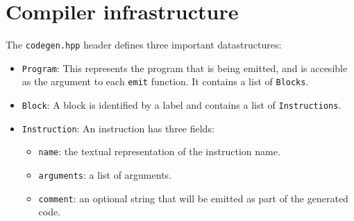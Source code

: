 \documentclass{report}
\begin{document}
	\section{Compiler infrastructure}
	The \texttt{codegen.hpp} header defines three important datastructures:
	\begin{itemize}
		\item \texttt{Program}: This represents the program that is being emitted, and is accesible as the argument to each \texttt{emit} function. It contains a list of \texttt{Blocks}.
		\item \texttt{Block}: A block is identified by a label and contains a list of \texttt{Instructions}.
		\item \texttt{Instruction}: An instruction has three fields:
		\begin{itemize}
			\item \texttt{name}: the textual representation of the instruction name.
			\item \texttt{arguments}: a list of arguments.
			\item \texttt{comment}: an optional string that will be emitted as part of the generated code.
		\end{itemize}
	\end{itemize}
\end{document}
